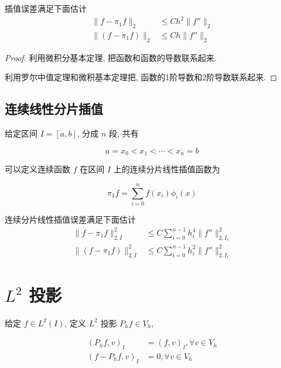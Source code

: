 \documentclass{article}
\begin{document}
\begin{framed}
    \begin{proposition}
        插值误差满足下面估计
        \begin{align*}
            \|f- \pi_1 f\|_2 &\leq C h^2 \|f''\|_2 \\
            \|(f - \pi_1 f)\|_2 &\leq C h \|f''\|_2
        \end{align*}
    \end{proposition}
    \begin{proof}
        利用微积分基本定理, 把函数和函数的导数联系起来. 

        利用罗尔中值定理和微积基本定理把, 函数的1阶导数和2阶导数联系起来.
    \end{proof}
\end{framed}

\subsection{连续线性分片插值}

给定区间 $I=[a, b]$, 分成 $n$ 段, 共有 

$$
a = x_0 < x_1 < \cdots < x_n=b
$$

可以定义连续函数 $f$ 在区间 $I$ 上的连续分片线性插值函数为

$$
\pi_1 f = \sum_{i=0}^n f(x_i) \phi_i(x)
$$

\begin{framed}
    \begin{proposition}
        连续分片线性插值误差满足下面估计
        \begin{align*}
            \|f- \pi_1 f\|_{2,I}^2 &\leq C \sum_{i=0}^{n-1} h_i^4 \|f''\|_{2,
            I_i}^2 \\
            \|(f - \pi_1 f)\|_{2, I}^2 &\leq C \sum_{i=0}^{n-1}h_i^2 \|f''\|_{2,
            I_i}^2
        \end{align*}
    \end{proposition}
\end{framed}

\section{$L^2$ 投影}

给定 $f\in L^2(I)$, 定义 $L^2$ 投影 $P_h f \in V_h$, 

\begin{align*}
    (P_h f, v)_I &= (f, v)_I, \forall v\in V_h\\
    (f - P_h f, v)_I &= 0, \forall v\in V_h
\end{align*}
\end{document}
